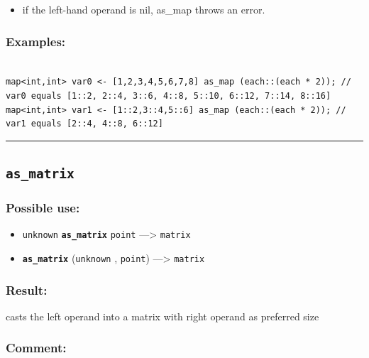 \documentclass[]{book}
\providecommand{\tightlist}{%
  \setlength{\itemsep}{0pt}\setlength{\parskip}{0pt}}
\theoremstyle{definition}
\theoremstyle{definition}
\theoremstyle{definition}
\theoremstyle{remark}
\begin{document}
\begin{itemize}
\tightlist
\item
  if the left-hand operand is nil, as\_map throws an error.
\end{itemize}

\subsubsection{Examples:}\label{examples-43}

\begin{verbatim}
 
map<int,int> var0 <- [1,2,3,4,5,6,7,8] as_map (each::(each * 2)); // var0 equals [1::2, 2::4, 3::6, 4::8, 5::10, 6::12, 7::14, 8::16] 
map<int,int> var1 <- [1::2,3::4,5::6] as_map (each::(each * 2)); // var1 equals [2::4, 4::8, 6::12] 
\end{verbatim}

\begin{center}\rule{0.5\linewidth}{\linethickness}\end{center}

\subsection{\texorpdfstring{\texttt{as\_matrix}}{as\_matrix}}\label{as_matrix}

\subsubsection{Possible use:}\label{possible-use-53}

\begin{itemize}
\tightlist
\item
  \texttt{unknown} \textbf{\texttt{as\_matrix}} \texttt{point}
  ---\textgreater{} \texttt{matrix}
\item
  \textbf{\texttt{as\_matrix}} (\texttt{unknown} , \texttt{point})
  ---\textgreater{} \texttt{matrix}
\end{itemize}

\subsubsection{Result:}\label{result-52}

casts the left operand into a matrix with right operand as preferred
size

\subsubsection{Comment:}\label{comment-12}
\end{document}
